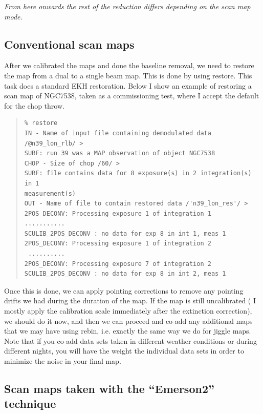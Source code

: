 \documentclass[twoside,11pt]{article}
\newenvironment{myquote}{\begin{quote}\begin{small}}{\end{small}\end{quote}}
\newcommand{\task}[1]{\textsf{#1}}
\newcommand{\rebin}{\xref{\task{rebin}}{sun216}{REBIN}}
\newcommand{\restore}{\xref{\task{restore}}{sun216}{RESTORE}}
\newcommand{\xref}[3]{#1}
\newcommand{\xlabel}[1]{}
\renewcommand{\_}{\texttt{\symbol{95}}}
\begin{document}
{\it From here onwards the rest of the reduction differs depending on the scan map mode.}

\subsection{\xlabel{Conventional_scan_maps}Conventional scan maps}

After we calibrated the maps and done the baseline removal, we need to
restore the map from a dual to a single beam map. This is done by
using \restore. This task does a standard EKH restoration. Below I show
an example of restoring a scan map of NGC7538, taken as a commissioning
test, where I accept the default for the chop throw.

\begin{myquote}
\begin{verbatim}
% restore
IN - Name of input file containing demodulated data /@n39_lon_rlb/ >
SURF: run 39 was a MAP observation of object NGC7538
CHOP - Size of chop /60/ > 
SURF: file contains data for 8 exposure(s) in 2 integration(s) in 1
measurement(s)
OUT - Name of file to contain restored data /'n39_lon_res'/ >
2POS_DECONV: Processing exposure 1 of integration 1
...........
SCULIB_2POS_DECONV : no data for exp 8 in int 1, meas 1
2POS_DECONV: Processing exposure 1 of integration 2
 ..........
2POS_DECONV: Processing exposure 7 of integration 2
SCULIB_2POS_DECONV : no data for exp 8 in int 2, meas 1
\end{verbatim}
\end{myquote}

Once this is done, we can apply pointing corrections to remove any
pointing drifts we had during the duration of the map. If the map is
still uncalibrated ( I mostly apply the calibration scale immediately
after the extinction correction), we should do it now, and then we can
proceed and co-add any additional maps that we may have using \rebin,
i.e. exactly the same way we do for jiggle maps. Note that if you co-add
data sets taken in different weather conditions or during different
nights, you will have the weight the individual data sets in  order to
minimize the noise in your final map.

\subsection{\xlabel{Emerson2_maps}Scan maps taken with the ``Emerson2'' technique}
\end{document}
